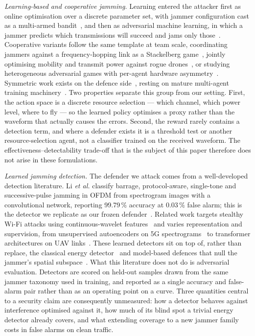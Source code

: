 \textit{Learning-based and cooperative jamming.}
Learning entered the attacker first as online optimisation over a discrete parameter set, with jammer configuration cast as a multi-armed bandit~\cite{amuru2016bandits}, and then as adversarial machine learning, in which a jammer predicts which transmissions will succeed and jams only those~\cite{erpek2019deep}.
Cooperative variants follow the same template at team scale, coordinating jammers against a frequency-hopping link as a Stackelberg game~\cite{zhang2025cooperative}, jointly optimising mobility and transmit power against rogue drones~\cite{valianti2024cooperative}, or studying heterogeneous adversarial games with per-agent hardware asymmetry~\cite{qin2025multi}.
Symmetric work exists on the defence side~\cite{xu2020convert,abolhassani2025coordinated,leuenberger2025proactive}, resting on mature multi-agent training machinery~\cite{NIPS2017_68a97503,rashid2018qmix,yu2022mappo}.
Two properties separate this group from our setting.
First, the action space is a discrete resource selection --- which channel, which power level, where to fly --- so the learned policy optimises a proxy rather than the waveform that actually causes the errors.
Second, the reward rarely contains a detection term, and where a defender exists it is a threshold test or another resource-selection agent, not a classifier trained on the received waveform.
The effectiveness--detectability trade-off that is the subject of this paper therefore does not arise in these formulations.

\textit{Learned jamming detection.}
The defender we attack comes from a well-developed detection literature.
Li \emph{et al.} classify barrage, protocol-aware, single-tone and successive-pulse jamming in OFDM from spectrogram images with a convolutional network, reporting 99.79\,\% accuracy at 0.03\,\% false alarm; this is the detector we replicate as our frozen defender~\cite{li2022jamming_ofdm}.
Related work targets stealthy Wi-Fi attacks using continuous-wavelet features~\cite{zhang2023detection} and varies representation and supervision, from unsupervised autoencoders on 5G spectrograms~\cite{varotto2024detecting} to transformer architectures on UAV links~\cite{viana2025pca}.
These learned detectors sit on top of, rather than replace, the classical energy detector~\cite{urkowitz1967energy} and model-based defences that null the jammer's spatial subspace~\cite{marti2023mitigating}.
What this literature does not do is adversarial evaluation.
Detectors are scored on held-out samples drawn from the same jammer taxonomy used in training, and reported as a single accuracy and false-alarm pair rather than as an operating point on a curve.
Three quantities central to a security claim are consequently unmeasured: how a detector behaves against interference optimised against it, how much of its blind spot a trivial energy detector already covers, and what extending coverage to a new jammer family costs in false alarms on clean traffic.

